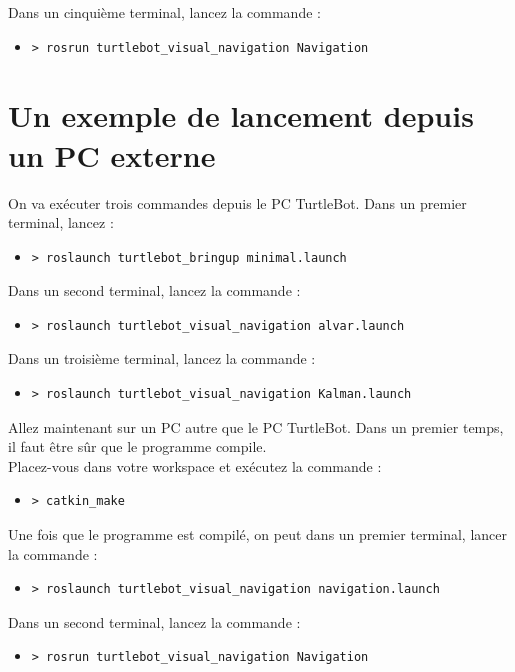 \documentclass[10pt,a4paper]{article}
\begin{document}
Dans un cinquième terminal, lancez la commande :
\begin{itemize}
\item[] \begin{verbatim}> rosrun turtlebot_visual_navigation Navigation \end{verbatim}
\end{itemize}

\section{Un exemple de lancement depuis un PC externe}

On va exécuter trois commandes depuis le PC TurtleBot. Dans un premier terminal, lancez :
\begin{itemize}
\item[] \begin{verbatim}> roslaunch turtlebot_bringup minimal.launch \end{verbatim}
\end{itemize}

Dans un second terminal, lancez la commande :
\begin{itemize}
\item[] \begin{verbatim}> roslaunch turtlebot_visual_navigation alvar.launch \end{verbatim}
\end{itemize}

Dans un troisième terminal, lancez la commande :
\begin{itemize}
\item[] \begin{verbatim}> roslaunch turtlebot_visual_navigation Kalman.launch \end{verbatim}
\end{itemize}

\vspace{0.5cm}
Allez maintenant sur un PC autre que le PC TurtleBot. Dans un premier temps, il faut être sûr que le programme compile. \\
Placez-vous dans votre workspace et exécutez la commande :
\begin{itemize}
\item[] \begin{verbatim}> catkin_make \end{verbatim}
\end{itemize}

Une fois que le programme est compilé, on peut dans un premier terminal, lancer la commande :
\begin{itemize}
\item[] \begin{verbatim}> roslaunch turtlebot_visual_navigation navigation.launch \end{verbatim}
\end{itemize}

Dans un second terminal, lancez la commande :
\begin{itemize}
\item[] \begin{verbatim}> rosrun turtlebot_visual_navigation Navigation \end{verbatim}
\end{itemize}
\end{document}
